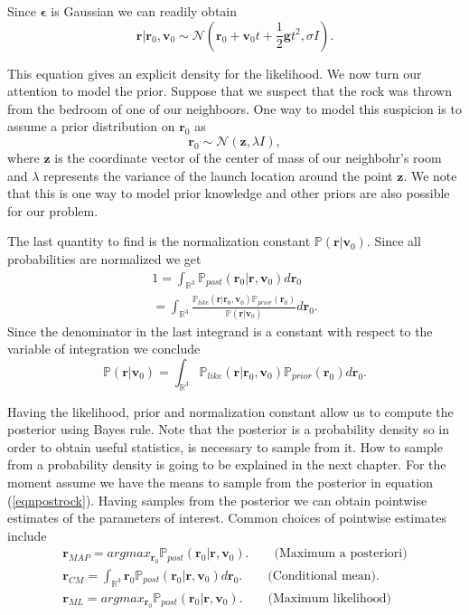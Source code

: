 \documentclass[12pt]{book}
\newcommand{\post}{\mathbb{P}_{post}}
\newcommand{\like}{\mathbb{P}_{like}}
\newcommand{\prior}{\mathbb{P}_{prior}}
\newcommand{\p}{\mathbb{P}}
\begin{document}
Since $\mathbf{\epsilon}$ is Gaussian we can readily obtain \cite{Somersalo}
\begin{equation*}
\textbf{r}|\textbf{r}_{0},\textbf{v}_{0}\sim \mathscr{N}(\textbf{r}_{0}+\textbf{v}_{0}t+\frac{1}{2}\textbf{g}t^{2}
,\sigma I).
\end{equation*}

This equation gives an explicit density for the likelihood. We now turn our attention to model the prior.
Suppose that we suspect that the rock was thrown from the bedroom of one of our neighboors.
 One way to model this suspicion is to assume a prior distribution on $\textbf{r}_{0}$ as
\begin{equation*}
\textbf{r}_{0}\sim\mathscr{N}(\textbf{z},\lambda I),
\end{equation*}
where $\textbf{z}$ is the coordinate vector of the center of mass of our neighbohr's room and $\lambda$ represents 
the variance of the launch location around the point $\textbf{z}$. We note that  this is one way to model 
 prior knowledge and other priors are also possible for our problem.

The last quantity to find is   the normalization constant $\p(\textbf{r}|\textbf{v}_{0})$. Since all
probabilities are normalized we get
\begin{eqnarray*}
1=\int_{\mathbb{R}^{3}}\post(\textbf{r}_{0}|\textbf{r},\textbf{v}_{0})d\textbf{r}_{0}\\
=\int_{\mathbb{R}^{3}}\frac{\like(\textbf{r}|\textbf{r}_{0},\textbf{v}_{0})
\prior(\textbf{r}_{0})}{\p(\textbf{r}|\textbf{v}_{0})}d\textbf{r}_{0}.
\end{eqnarray*} 
Since the denominator in the last integrand is a constant with respect to the variable of integration 
we conclude
\begin{equation*}
\p(\textbf{r}|\textbf{v}_{0})=\int_{\mathbb{R}^{3}}\like(\textbf{r}|\textbf{r}_{0},\textbf{v}_{0})
\prior(\textbf{r}_{0})d\textbf{r}_{0}.
\end{equation*}


Having the likelihood, prior and normalization constant allow us to compute the posterior using
Bayes rule. Note that the posterior is a probability density so in order to obtain useful
statistics,  is necessary to sample from it. How to sample from a probability density is going
to be explained in the next chapter. For the moment assume we have the means to sample from the 
posterior in equation (\ref{eqnpostrock}). Having samples from the posterior we can obtain
pointwise estimates of the parameters of interest. Common choices of pointwise estimates
include
\begin{eqnarray*}
\textbf{r}_{MAP}=argmax_{\textbf{r}_{0}}\post(\textbf{r}_{0}|\textbf{r},\textbf{v}_{0}). 
\qquad\text{(Maximum a posteriori)}\\
\textbf{r}_{CM}=\int_{\mathbb{R}^{3}}\textbf{r}_{0}\post(\textbf{r}_{0}|\textbf{r},\textbf{v}_{0})d\textbf{r}_{0}.
\qquad\text{(Conditional mean)}. \\
\textbf{r}_{ML}=argmax_{\textbf{r}_{0}}\post(\textbf{r}_{0}|\textbf{r},\textbf{v}_{0}).
\qquad\text{(Maximum likelihood)}
\end{eqnarray*}
\end{document}

